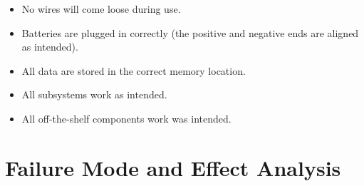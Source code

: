 \documentclass{article}
\begin{document}
\begin{itemize}
	\item No wires will come loose during use.
	\item Batteries are plugged in correctly (the positive and negative ends are aligned as intended).
	\item All data are stored in the correct memory location.
	\item All subsystems work as intended.
	\item All off-the-shelf components work was intended.
\end{itemize}

\section{Failure Mode and Effect Analysis}
\end{document}
